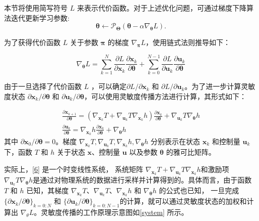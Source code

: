 \documentclass[lang=chs, degree=master, blindreview=false, winfonts=true]{yanputhesis}
\begin{document}
本节将使用简写符号 \( L \) 来表示代价函数。对于上述优化问题，可通过梯度下降算法迭代更新学习参数:
\begin{equation}
    \bm \theta\leftarrow\mathcal{P}_{\bm \Theta}(\bm \theta-\alpha\nabla_{\bm \theta}L).
\end{equation}

为了获得代价函数 $L$ 关于参数 $\bm \pi$ 的梯度 $\nabla_{\bm \pi} L$，使用链式法则推导如下：

\begin{equation}
    \nabla_{\bm \theta} L = \sum_{k=1}^{N} \frac{\partial L}{\partial \bm x_k} \frac{\partial \bm x_k}{\partial \bm \theta} + \sum_{k=0}^{N-1} \frac{\partial L}{\partial \bm u_k} \frac{\partial \bm u_k}{\partial \bm \theta}
\end{equation}

由于一旦选择了代价函数 
$L$ ，可以确定${\partial L}/{\partial \bm x_k}$ 和 ${\partial L}/{\partial \bm u_k}$。为了进一步计算灵敏度状态 ${\partial \bm x_k}/{\partial \bm \theta}$ 和 ${\partial \bm u_k}/{\partial \bm \theta}$，可以使用灵敏度传播方法进行计算，其形式如下：

\begin{equation}
	\begin{gathered}
		\frac{\partial \bm x_{k+1}}{\partial \bm \theta} = ({\nabla}_{\bm x_k}  T + {\nabla}_{\bm u_k} T {\nabla}_{\bm x_k} h) \frac{\partial \bm x_k}{\partial \bm \theta} + {\nabla}_{\bm u_k} T {\nabla_{\bm \theta}} h\\
		\frac{\partial \bm u_k}{\partial \bm \theta} = {\nabla}_{\bm x_k} h \frac{\partial \bm x_k}{\partial \bm \theta} + {\nabla_{\bm \theta}} h
	\end{gathered}
\end{equation}
其中 \( {\partial \bm x_0}/{\partial \bm \theta} = 0 \)。梯度
\( {\nabla}_{\bm x_k} T, {\nabla}_{\bm u_k} T, {\nabla}_{\bm x_k} h, {\nabla_{\bm \theta}} h \) 分别表示在状态 $\bm x_k$ 和控制量 $\bm u_k$ 下，函数 $T$ 和 $h$ 关于状态 $\bm x$、控制量 $\bm u$ 以及参数 $\bm \theta$ 的雅可比矩阵。

实际上，\autoref{6} 是一个时变线性系统，
系统矩阵 ${\nabla}_{\bm{x}_k} T + {\nabla}_{\bm{u}_k} T {\nabla}_{\bm{x}_k} h$和激励项 ${\nabla}_{\bm{u}_k} T {\nabla}_{\bm{\theta}} h$是通过对物理系统的数据进行采样并计算得到的。具体而言，由于函数 $T$ 和 $h$ 已知，其梯度 $\nabla_{\bm{x}_k} T$、$\nabla_{\bm{u}_k} T$、$\nabla_{\bm{x}_k} h$ 和 $\nabla_{\bm{\theta}} h$ 的公式也已知，
一旦完成 $\{\partial \bm{x}_k / \partial \bm{\theta}\}_{k=0:N}$ 和 $\{\partial \bm{u}_k / \partial \bm{\theta}\}_{k=0:N-1}$的计算，就可以通过灵敏度状态的加权和计算出 $\nabla_{\theta} L$。灵敏度传播的工作原理示意图如\autoref{system} 所示。
\end{document}
